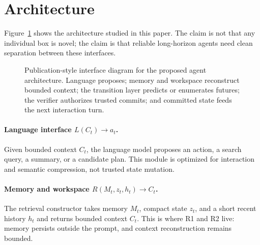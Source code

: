 \documentclass[11pt]{article}
\begin{document}
\section{Architecture}
Figure~\ref{fig:architecture} shows the architecture studied in this paper. The claim is not that any individual box is novel; the claim is that reliable long-horizon agents need clean separation between these interfaces.

\begin{figure}[t]
\centering
{}
\caption{Publication-style interface diagram for the proposed agent architecture. Language proposes; memory and workspace reconstruct bounded context; the transition layer predicts or enumerates futures; the verifier authorizes trusted commits; and committed state feeds the next interaction turn.}
\label{fig:architecture}
\end{figure}

\paragraph{Language interface $L(C_t) \rightarrow a_t$.} Given bounded context $C_t$, the language model proposes an action, a search query, a summary, or a candidate plan. This module is optimized for interaction and semantic compression, not trusted state mutation.

\paragraph{Memory and workspace $R(M_t, z_t, h_t) \rightarrow C_t$.} The retrieval constructor takes memory $M_t$, compact state $z_t$, and a short recent history $h_t$ and returns bounded context $C_t$. This is where R1 and R2 live: memory persists outside the prompt, and context reconstruction remains bounded.
\end{document}
